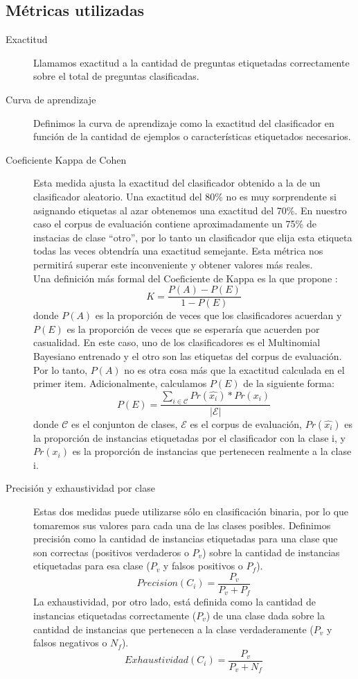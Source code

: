 \subsection{Métricas utilizadas}
\begin{description}
    \item[Exactitud] Llamamos exactitud a la cantidad de preguntas etiquetadas correctamente sobre el total de preguntas clasificadas.
    \item[Curva de aprendizaje] Definimos la curva de aprendizaje como la exactitud del clasificador en función de la cantidad de ejemplos o características etiquetados necesarios.
    \item [Coeficiente Kappa de Cohen] Esta medida ajusta la exactitud del clasificador obtenido a la de un clasificador aleatorio. Una exactitud del 80\% no es muy sorprendente si asignando etiquetas al azar obtenemos una exactitud del 70\%. En nuestro caso el corpus de evaluación contiene aproximadamente un 75\% de instacias de clase ``otro'', por lo tanto un clasificador que elija esta etiqueta todas las veces obtendría una exactitud semejante. Esta métrica nos permitirá superar este inconveniente y obtener valores más reales.\\
    Una definición más formal del Coeficiente de Kappa es la que propone \citet{KappaCarletta}:
    $$K = \frac{P(A)-P(E)}{1-P(E)}$$
    donde $P(A)$ es la proporción de veces que los clasificadores acuerdan y $P(E)$ es la proporción de veces que se esperaría que acuerden por casualidad. En este caso, uno de los clasificadores es el Multinomial Bayesiano entrenado y el otro son las etiquetas del corpus de evaluación. Por lo tanto, $P(A)$ no es otra cosa más que la exactitud calculada en el primer item. Adicionalmente, calculamos $P(E)$ de la siguiente forma:
    $$P(E) = \frac{\sum_{i\in\mathcal{C}}Pr(\hat{x_i})*Pr(x_i)}{|\mathcal{E}|}$$
    donde $\mathcal{C}$ es el conjunton de clases, $\mathcal{E}$ es el corpus de evaluación, $Pr(\hat{x_i})$ es la proporción de instancias etiquetadas por el clasificador con la clase i, y $Pr(x_i)$ es la proporción de instancias que pertenecen realmente a la clase i.
    \item [Precisión y exhaustividad por clase] Estas dos medidas puede utilizarse sólo en clasificación binaria, por lo que tomaremos sus valores para cada una de las clases posibles. Definimos precisión como la cantidad de instancias etiquetadas para una clase que son correctas (positivos verdaderos o $P_v$) sobre la cantidad de instancias etiquetadas para esa clase ($P_v$ y falsos positivos o $P_f$).
    $$Precision(C_i) = \frac{P_v}{P_v + P_f}$$
    La exhaustividad, por otro lado, está definida como la cantidad de instancias etiquetadas correctamente ($P_v$) de una clase dada sobre la cantidad de instancias que pertenecen a la clase verdaderamente ($P_v$ y falsos negativos o $N_f$).
    $$Exhaustividad(C_i) = \frac{P_v}{P_v + N_f}$$
\end{description}

